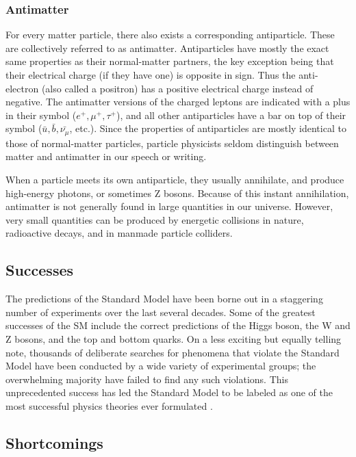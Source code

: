 \subsubsection*{Antimatter}
For every matter particle, there also exists a corresponding
antiparticle. These are collectively referred to as
antimatter. Antiparticles have mostly the exact same properties as
their normal-matter partners, the key exception being that their electrical charge (if
they have one) is opposite in sign. Thus the anti-electron (also
called a positron) has a positive electrical charge instead of
negative. The antimatter versions of the charged leptons are indicated
with a plus in their symbol ($e^+, \mu^+, \tau^+$), and all other
antiparticles have a bar on top of their symbol ($\bar{u},
\bar{b}, \bar{\nu_{\mu}}$, etc.). Since the properties of
antiparticles are mostly identical to those of normal-matter
particles, particle physicists seldom distinguish between matter and
antimatter in our speech or writing.

When a particle meets its own antiparticle, they usually annihilate,
and produce high-energy photons, or sometimes Z bosons. Because of this
instant annihilation, antimatter is not generally found
in large quantities in our universe. However, very small quantities can be
produced by energetic collisions in nature, radioactive decays, and in manmade
particle colliders.

\subsection{Successes}
\label{ssec:SM:successes}

The predictions of the Standard Model have been borne out in a
staggering number of experiments over the last several decades.
Some of the greatest successes of the SM
include the correct predictions of the Higgs boson, the W and Z
bosons, and the top and bottom quarks. On a less exciting but equally
telling note, thousands of deliberate searches for phenomena that
violate the Standard Model have been conducted by a wide variety of
experimental groups; the overwhelming majority have failed to find
any such violations. This unprecedented success has led the
Standard Model to be labeled as one of the most successful
physics theories ever formulated \cite{griffiths,smcoffee}.

\subsection{Shortcomings}
\label{ssec:SM:shortcomings}

